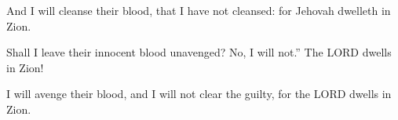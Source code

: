 			\begin{versebox}
					\item[BHS] 
					\item[LXX] 
					\item[ASV] And I will cleanse their blood, that I have not cleansed: for Jehovah dwelleth in Zion.
					\item[NIV] Shall I leave their innocent blood unavenged? No, I will not.” The LORD dwells in Zion!
					\item[NRSV] I will avenge their blood, and I will not clear the guilty, for the LORD dwells in Zion.
			\end{versebox}
